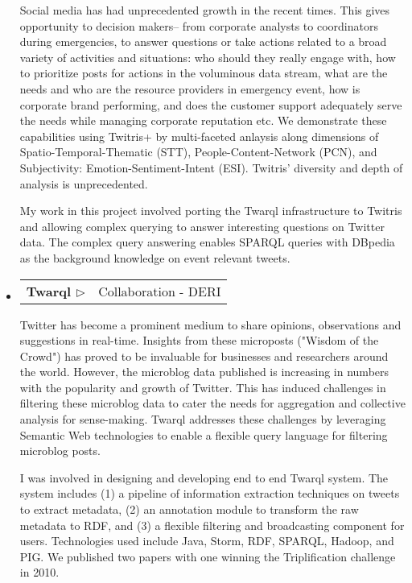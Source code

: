 \documentclass[letterpaper,9pt]{article}
\makeatletter
\newcommand{\resprojectheading}[2]{
\begin{tabular*}{7.0in}{l@{\extracolsep{\fill}}r}
		\textbf{#1} & #2\\
\end{tabular*}\vspace{-6pt}}
\makeatother
\begin{document}
\begin{itemize}
\justify
\hspace{1em} Social media has had unprecedented growth in the recent times. This gives opportunity to decision makers-- from corporate analysts to coordinators during emergencies, to answer questions or take actions related to a broad variety of activities and situations: who should they really engage with, how to prioritize posts for actions in the voluminous data stream, what are the needs and who are the resource providers in emergency event, how is corporate brand performing, and does the customer support adequately serve the needs while managing corporate reputation etc. We demonstrate these capabilities using Twitris+ by multi-faceted anlaysis along dimensions of Spatio-Temporal-Thematic (STT), People-Content-Network (PCN), and Subjectivity: Emotion-Sentiment-Intent (ESI). Twitris' diversity and depth of analysis is unprecedented. 

\justify
\hspace{1em} My work in this project involved porting the Twarql infrastructure to Twitris and allowing complex querying to answer interesting questions on Twitter data. The complex query answering enables SPARQL queries with DBpedia as the background knowledge on event relevant tweets. \\

\item
\resprojectheading{Twarql \href{http://wiki.knoesis.org/index.php/Twarql}{$\triangleright$}}{Collaboration - DERI}
	\vspace{0.1in}
	
	\justify
\hspace{1em}  Twitter has become a prominent medium to share opinions, observations and suggestions in real-time. Insights from these microposts ("Wisdom of the Crowd") has proved to be invaluable for businesses and researchers around the world. However, the microblog data published is increasing in numbers with the popularity and growth of Twitter. This has induced challenges in filtering these microblog data to cater the needs for aggregation and collective analysis for sense-making. Twarql addresses these challenges by leveraging Semantic Web technologies to enable a flexible query language for filtering microblog posts.
    
    \justify
\hspace{1em}     I was involved in designing and developing end to end Twarql system. The system includes (1) a pipeline of information extraction techniques on tweets to extract metadata, (2) an annotation module to transform the  raw metadata to RDF, and (3) a flexible filtering and broadcasting component for users. Technologies used include Java, Storm, RDF, SPARQL, Hadoop, and PIG. We published two papers with one winning the Triplification challenge in 2010.  


\end{itemize}
\end{document}
